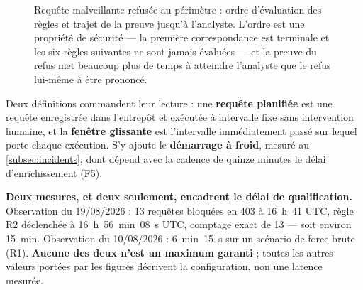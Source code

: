 \begin{figure}[htbp]
\caption[Requête malveillante refusée au périmètre]{Requête malveillante refusée au périmètre :
ordre d'évaluation des règles et trajet de la preuve jusqu'à l'analyste. L'ordre est une propriété
de sécurité --- la première correspondance est terminale et les six règles suivantes ne sont jamais
évaluées --- et la preuve du refus met beaucoup plus de temps à atteindre l'analyste que le refus
lui-même à être prononcé.}
\label{fig:seq-refus}
\end{figure}


Deux définitions commandent leur lecture : une \textbf{requête planifiée} est une requête
enregistrée dans l'entrepôt et exécutée à intervalle fixe sans intervention humaine, et la
\textbf{fenêtre glissante} est l'intervalle immédiatement passé sur lequel porte chaque exécution.
S'y ajoute le \textbf{démarrage à froid}, mesuré au \cref{subsec:incidents}, dont dépend avec la
cadence de quinze minutes le délai d'enrichissement (F5).

\textbf{Deux mesures, et deux seulement, encadrent le délai de qualification.} Observation du
19/08/2026 : 13 requêtes bloquées en 403 à 16~h~41 UTC, règle R2 déclenchée à 16~h~56~min~08~s UTC,
comptage exact de 13 --- soit environ 15~min. Observation du 10/08/2026 : 6~min~15~s sur un
scénario de force brute (R1). \textbf{Aucune des deux n'est un maximum garanti} ; toutes les autres
valeurs portées par les figures décrivent la configuration, non une latence mesurée.

